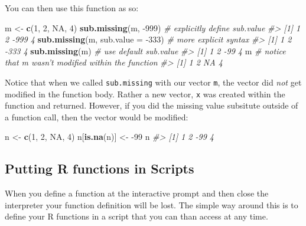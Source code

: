 \documentclass[]{book}
\newenvironment{Shaded}{\begin{snugshade}}{\end{snugshade}}
\newcommand{\CommentTok}[1]{\textcolor[rgb]{0.56,0.35,0.01}{\textit{#1}}}
\newcommand{\DataTypeTok}[1]{\textcolor[rgb]{0.13,0.29,0.53}{#1}}
\newcommand{\DecValTok}[1]{\textcolor[rgb]{0.00,0.00,0.81}{#1}}
\newcommand{\KeywordTok}[1]{\textcolor[rgb]{0.13,0.29,0.53}{\textbf{#1}}}
\newcommand{\NormalTok}[1]{#1}
\newcommand{\OtherTok}[1]{\textcolor[rgb]{0.56,0.35,0.01}{#1}}
\newcommand{\StringTok}[1]{\textcolor[rgb]{0.31,0.60,0.02}{#1}}
\theoremstyle{definition}
\theoremstyle{definition}
\theoremstyle{definition}
\theoremstyle{remark}
\begin{document}
You can then use this function as so:

\begin{Shaded}
\begin{Highlighting}[]
\NormalTok{m <-}\StringTok{ }\KeywordTok{c}\NormalTok{(}\DecValTok{1}\NormalTok{, }\DecValTok{2}\NormalTok{, }\OtherTok{NA}\NormalTok{, }\DecValTok{4}\NormalTok{)}
\KeywordTok{sub.missing}\NormalTok{(m, }\DecValTok{-999}\NormalTok{)  }\CommentTok{# explicitly define sub.value}
\CommentTok{#> [1]    1    2 -999    4}
\KeywordTok{sub.missing}\NormalTok{(m, }\DataTypeTok{sub.value =} \DecValTok{-333}\NormalTok{) }\CommentTok{# more explicit syntax}
\CommentTok{#> [1]    1    2 -333    4}
\KeywordTok{sub.missing}\NormalTok{(m)   }\CommentTok{# use default sub.value}
\CommentTok{#> [1]   1   2 -99   4}
\NormalTok{m  }\CommentTok{# notice that m wasn't modified within the function}
\CommentTok{#> [1]  1  2 NA  4}
\end{Highlighting}
\end{Shaded}

Notice that when we called \texttt{sub.missing} with our vector
\texttt{m}, the vector did \emph{not} get modified in the function body.
Rather a new vector, \texttt{x} was created within the function and
returned. However, if you did the missing value subsitute outside of a
function call, then the vector would be modified:

\begin{Shaded}
\begin{Highlighting}[]
\NormalTok{n <-}\StringTok{ }\KeywordTok{c}\NormalTok{(}\DecValTok{1}\NormalTok{, }\DecValTok{2}\NormalTok{, }\OtherTok{NA}\NormalTok{, }\DecValTok{4}\NormalTok{)}
\NormalTok{n[}\KeywordTok{is.na}\NormalTok{(n)] <-}\StringTok{ }\DecValTok{-99}
\NormalTok{n}
\CommentTok{#> [1]   1   2 -99   4}
\end{Highlighting}
\end{Shaded}

\hypertarget{putting-r-functions-in-scripts}{%
\subsection{Putting R functions in
Scripts}\label{putting-r-functions-in-scripts}}

When you define a function at the interactive prompt and then close the
interpreter your function definition will be lost. The simple way around
this is to define your R functions in a script that you can than access
at any time.
\end{document}
